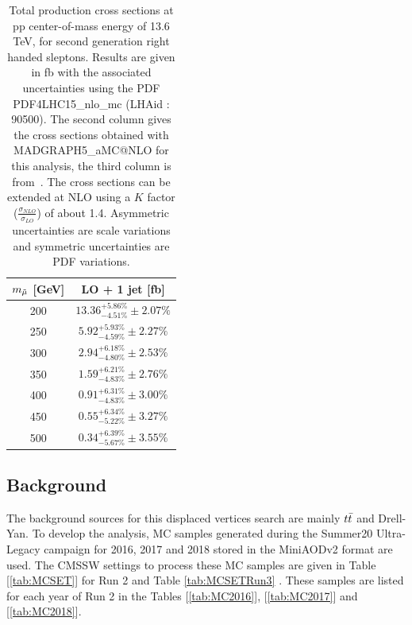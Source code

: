 \documentclass{cernatlasnote}
\begin{document}
\begin{table}
    \centering
    \begin{tabular}{ | c || c |}
        \hline
        \rowcolor{lightgray} 
         $m_{\Tilde{\mu}}$ [GeV]  & LO + 1 jet [fb]  \\
         \hline
         \hline
         200 & $13.36^{+5.86\%}_{-4.51\%} \pm 2.07\% $  \\
         \hline
         250  & $5.92^{+5.93\%}_{-4.59\%} \pm 2.27\%$    \\
         \hline
         300  & $2.94^{+6.18\%}_{-4.80\%} \pm 2.53\%$  \\
         \hline
         350  & $1.59^{+6.21\%}_{-4.83\%} \pm 2.76\% $   \\
         \hline
         400   & $0.91^{+6.31\%}_{-4.83\%} \pm 3.00\%$  \\
         \hline
         450   & $0.55^{+6.34\%}_{-5.22\%} \pm 3.27\%$   \\
         \hline
         500  & $0.34^{+6.39\%}_{-5.67\%} \pm 3.55\%$  \\
         \hline
    \end{tabular}
    \caption{Total production cross sections at pp center-of-mass  energy of 13.6 TeV, for second generation right handed sleptons. Results are given in fb with the associated uncertainties using the PDF PDF4LHC15\_nlo\_mc (LHAid : 90500). The second column gives the cross sections obtained with MADGRAPH5\_aMC@NLO for this analysis, the third column is from~\cite{Fuks_2014}. The cross sections can be extended at NLO using a $K$ factor ($\frac{\sigma_{NLO}}{\sigma_{LO}}$) of about 1.4. Asymmetric uncertainties are scale variations and symmetric uncertainties are PDF variations.} 
    \label{tab:RIGHTXS13p6}
\end{table}


\subsection{Background}

 The background sources for this displaced vertices search are mainly $t\Bar{t}$ and Drell-Yan.
To develop the analysis, MC samples generated during the Summer20 Ultra-Legacy campaign for 2016, 2017 and 2018 stored in the MiniAODv2 format are used. The CMSSW settings to process these MC samples are given in Table [\ref{tab:MCSET}] for Run 2 and Table \ref{tab:MCSETRun3} .
These samples are listed for each year of Run 2 in the Tables [\ref{tab:MC2016}], [\ref{tab:MC2017}] and [\ref{tab:MC2018}].
\end{document}
